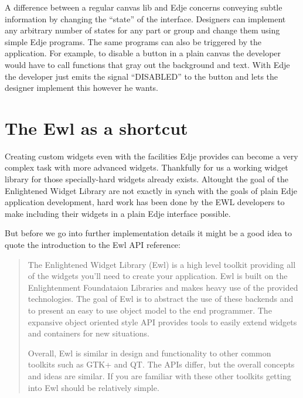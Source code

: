 \documentclass[12pt,a4paper,english]{book}
\begin{document}
A difference between a regular canvas lib and Edje concerns conveying subtle
information by changing the ``state'' of the interface. Designers can implement
any arbitrary number of states for any part or group and change them using
simple Edje programs. The same programs can also be triggered by the
application. For example, to disable a button in a plain canvas the developer
would have to call functions that gray out the background and text. With Edje
the developer just emits the signal ``DISABLED'' to the button and lets the
designer implement this however he wants.



\hypertarget{the-ewl-as-a-shortcut}{}
\section{The Ewl as a shortcut}
\label{the-ewl-as-a-shortcut}

Creating custom widgets even with the facilities Edje provides can become a
very complex task with more advanced widgets. Thankfully for us a working
widget library for those specially-hard widgets already exists. Altought the
goal of the Enlightened Widget Library are not exactly in synch with the goals
of plain Edje application development, hard work has been done by the EWL
developers to make including their widgets in a plain Edje interface possible.

But before we go into further implementation details it might be a good idea to
quote the introduction to the Ewl API reference:
\begin{quote}

The Enlightened Widget Library (Ewl) is a high level toolkit providing all
of the widgets you'll need to create your application. Ewl is built on the
Enlightenment Foundataion Libraries and makes heavy use of the provided
technologies. The goal of Ewl is to abstract the use of these backends and
to present an easy to use object model to the end programmer. The expansive
object oriented style API provides tools to easily extend widgets and
containers for new situations.

Overall, Ewl is similar in design and functionality to other common
toolkits such as GTK+ and QT. The APIs differ, but the overall concepts and
ideas are similar. If you are familiar with these other toolkits getting
into Ewl should be relatively simple.
\end{quote}
\end{document}
